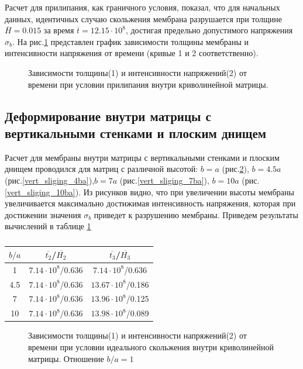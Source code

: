 Расчет для прилипания, как граничного условия,	показал, что для начальных данных, идентичных случаю скольжения 
	мембрана разрушается при толщине $\overline{H}=0.015$ за время $\overline{t}=12.15\cdot 10^8$, достигая предельно допустимого напряжения $\sigma_b$.    На рис.\ref{quad_sticking} представлен график зависимости толщины мембраны и интенсивности напряжения от времени (кривые 1 и 2 соответственно).
   
		\begin{figure}[h!]	
				\def\svgwidth{\columnwidth}
				\caption{Зависимости толщины(1) и интенсивности напряжений(2) от времени при условии прилипания внутри криволинейной матрицы. } 
				\label{quad_sticking}
		\end{figure}

\subsection{Деформирование внутри матрицы с вертикальными стенками и плоским днищем}
		
		Расчет для мембраны внутри матрицы с вертикальными стенками и плоским днищем проводился для матриц с различной высотой:
		$b = a$ (рис.\ref{vert_sliging_ba}), $b = 4.5a$ (рис.\ref{vert_sliging_4ba}),$b=7a$ (рис.\ref{vert_sliging_7ba}), $b=10a$ (рис.\ref{vert_sliging_10ba}). Из рисунков видно, что при увеличении высоты мембраны увеличивается максимально достижимая интенсивность напряжения, которая при достижении значения $\sigma_b$ приведет к разрушению мембраны. Приведем результаты вычислений в таблице \ref{vert_table}
\begin{table}
\begin{center}

\renewcommand{\arraystretch}{2}

\begin{tabular}{|c|c|c|}
\hline
$b/a$    & $\overline{t_2}$/$\overline{H_2}$ & $\overline{t_3}$/$\overline{H_3}$ \\
\hline\hline
1    & $7.14\cdot10^8$/0.636  & $7.14\cdot10^8$/0.636\\ \hline
4.5  & $7.14\cdot10^8$/0.636  & $13.67\cdot10^8$/0.186\\ \hline
7    & $7.14\cdot10^8$/0.636  & $13.96\cdot10^8$/0.125\\ \hline
10   & $7.14\cdot10^8$/0.636  & $13.98\cdot10^8$/0.089\\ \hline
\end{tabular}

\end{center}
\label{vert_table}
\caption{}
\end{table}				 
		\begin{figure}[h!]	
				\def\svgwidth{\columnwidth}
				\caption{Зависимости толщины(1) и интенсивности напряжений(2) от времени при условии идеального скольжения внутри криволинейной матрицы. Отношение $b/a = 1$} 
				\label{vert_sliging_ba}
		\end{figure}

